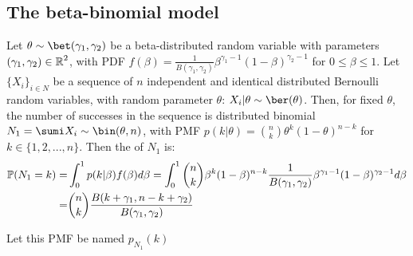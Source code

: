 \subsection{The beta-binomial model}
Let  $\theta\sim\bet(\gamma_1,\gamma_2)$ be a beta-distributed random variable with parameters $(\gamma_1,\gamma_2)\in\operatorname{\mathbb{R}}^2$, with PDF $f(\beta)=\frac{1}{B(\gamma_1,\gamma_2)}\beta^{\gamma_1-1}(1-\beta)^{\gamma_2-1}$ for $0\leq\beta\leq 1$. Let $\{X_i\}_{i\in N}$ be a sequence of $n$ independent and identical distributed Bernoulli random variables, with random parameter $\theta$: $X_i|\theta\sim\ber(\theta)$. Then, for fixed $\theta$, the number of successes in the sequence is distributed binomial $N_1=\sumi X_i\sim \bin(\theta,n)$, with PMF $p(k|\theta)=\binom{n}{k}\theta^k(1-\theta)^{n-k}$ for $k\in\{1, 2,..., n\}$. Then the  of $N_1$ is: 
\begin{align*}
    \operatorname{\mathbb{P}}(N_1=k) =& \int_{0}^{1} p(k|\beta)f(\beta)d\beta=\int_{0}^{1}\binom{n}{k}\beta^k(1-\beta)^{n-k}\frac{1}{B(\gamma_1,\gamma_2)}\beta^{\gamma_1-1}(1-\beta)^{\gamma_2-1}d\beta\\
    =& \binom{n}{k}\frac{B(k+\gamma_1, n-k+\gamma_2)}{B(\gamma_1,\gamma_2)}
\end{align*}

Let this PMF be named $p_{N_1}(k)$


